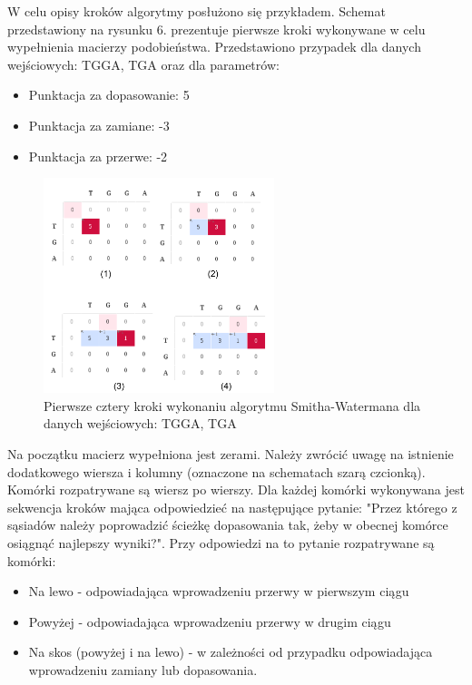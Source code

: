 \documentclass[a4paper,12pt]{article}
\newenvironment{lista}{
\begin{itemize}
  \setlength{\itemsep}{1pt}
  \setlength{\parskip}{0pt}
  \setlength{\parsep}{0pt}
}{\end{itemize}}
\begin{document}
W celu opisy kroków algorytmy posłużono się przykładem. Schemat przedstawiony na rysunku 6. prezentuje pierwsze kroki wykonywane w celu wypełnienia macierzy podobieństwa. Przedstawiono przypadek dla danych wejściowych: TGGA, TGA oraz dla parametrów:
\begin{lista}
\item Punktacja za dopasowanie: 5
\item Punktacja za zamiane: -3
\item Punktacja za przerwe: -2
\end{lista}

\begin{figure}[H]
  \vspace{5pt}
  \centering
  \begin{center}
  \includegraphics[width=0.6\textwidth]{images/SchematDzialaniaAlgorytmu.png}
  \end{center}
  \caption{Pierwsze cztery kroki wykonaniu algorytmu Smitha-Watermana dla danych wejściowych: TGGA, TGA}
 \end{figure}

Na początku macierz wypełniona jest zerami. Należy zwrócić uwagę na istnienie dodatkowego wiersza i kolumny (oznaczone na schematach szarą czcionką). Komórki rozpatrywane są wiersz po wierszy. Dla każdej komórki wykonywana jest sekwencja kroków mająca odpowiedzieć na następujące pytanie: "Przez którego z sąsiadów należy poprowadzić ścieżkę dopasowania tak, żeby w obecnej komórce osiągnąć najlepszy wyniki?". Przy odpowiedzi na to pytanie rozpatrywane są komórki:
\begin{lista}
\item Na lewo - odpowiadająca wprowadzeniu przerwy w pierwszym ciągu
\item Powyżej - odpowiadająca wprowadzeniu przerwy w drugim ciągu
\item Na skos (powyżej i na lewo) - w zależności od przypadku odpowiadająca wprowadzeniu zamiany lub dopasowania.
\end{lista}
\end{document}
